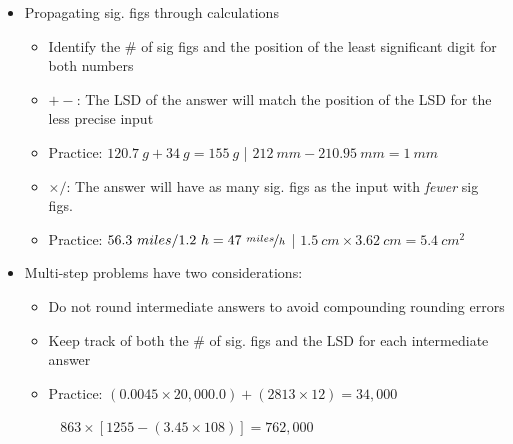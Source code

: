 \documentclass[12pt, openany, letterpaper]{memoir}
\begin{document}
\begin{itemize}
	\item Propagating sig. figs through calculations
	      \begin{itemize}
		      \item Identify the \# of sig figs and the position of the least significant digit for both numbers
		      \item $+-$: The LSD of the answer will match the position of the LSD for the less precise input
		      \item Practice: $120.7~g + 34~g = 155~g$ \hspace{1em}|\hspace{1em} $212~mm - 210.95~mm = 1~mm$
		      \item $\times/$: The answer will have as many sig. figs as the input with \emph{fewer} sig figs.
		      \item Practice: $56.3~miles / 1.2~h = 47~\nicefrac{miles}{h}$ \hspace{1em}|\hspace{1em} $1.5~cm\times3.62~cm = 5.4~cm^2$
	      \end{itemize}
	\item Multi-step problems have two considerations:
	      \begin{itemize}
		      \item Do not round intermediate answers to avoid compounding rounding errors
		      \item Keep track of both the \# of sig. figs and the LSD for each intermediate answer
		      \item Practice: $(0.0045\times20,000.0)+(2813\times12)=34,000$

		            ~\hphantom{Practice:} $863\times\left[1255-\left(3.45\times108\right)\right]=762,000$
	      \end{itemize}
\end{itemize}
\end{document}
